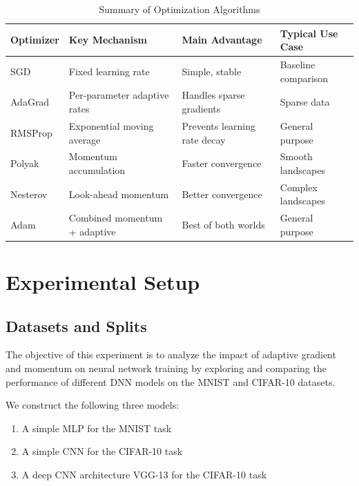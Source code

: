 \documentclass[12pt]{article}
\begin{document}
\begin{table}[H]
\centering
\caption{Summary of Optimization Algorithms}
\label{tab:optimizer_summary}
\begin{tabularx}{\textwidth}{l >{\raggedright\arraybackslash}X >{\raggedright\arraybackslash}X >{\raggedright\arraybackslash}X} 
\toprule %
\textbf{Optimizer} & \textbf{Key Mechanism} & \textbf{Main Advantage} & \textbf{Typical Use Case} \\
\midrule %
SGD & Fixed learning rate & Simple, stable & Baseline comparison \\
AdaGrad & Per-parameter adaptive rates & Handles sparse gradients & Sparse data \\
RMSProp & Exponential moving average & Prevents learning rate decay & General purpose \\
Polyak & Momentum accumulation & Faster convergence & Smooth landscapes \\
Nesterov & Look-ahead momentum & Better convergence & Complex landscapes \\
Adam & Combined momentum + adaptive & Best of both worlds & General purpose \\
\bottomrule %
\end{tabularx}
\end{table}




\section{Experimental Setup}

\subsection{Datasets and Splits}

The objective of this experiment is to analyze the impact of adaptive gradient and momentum on neural network training by exploring and comparing the performance of different DNN models on the MNIST and CIFAR-10 datasets.

We construct the following three models:
\begin{enumerate}
    \item A simple MLP for the MNIST task
    \item A simple CNN for the CIFAR-10 task
    \item A deep CNN architecture VGG-13 for the CIFAR-10 task
\end{enumerate}
\end{document}
